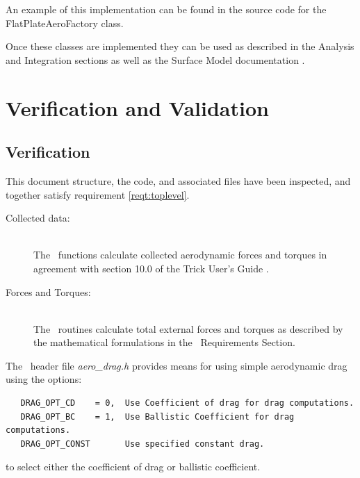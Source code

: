 An example of this implementation can be found in the source code for
the FlatPlateAeroFactory class.

Once these classes are implemented they can be used as described in
the Analysis and Integration sections as well as the
Surface Model documentation \cite{dynenv:SURFACEMODEL}.

\chapter{Verification and Validation}\label{ch:ivv}

\section{Verification}
\label{inspect:TLI}
 This document structure, the code, and associated files have been inspected, and together satisfy requirement \ref{reqt:toplevel}.


\label{inspect:math}
\begin{description}
\item[Collected data:] \ \\
The \aerodynamicsDesc\ functions calculate collected aerodynamic forces and
torques in agreement with section 10.0 of the Trick User's Guide
\cite{Vetter:TrickUser}.
\item[Forces and Torques:] \ \\
The \aerodynamicsDesc\ routines calculate total external forces and torques
as described by the mathematical formulations
in the \aerodynamicsDesc\ Requirements Section.
\end{description}

\label{inspect:aerod}
The \aerodynamicsDesc\ header file {\em aero\_drag.h} provides means for
using simple aerodynamic drag using the options:
\begin{verbatim}
   DRAG_OPT_CD    = 0,  Use Coefficient of drag for drag computations.
   DRAG_OPT_BC    = 1,  Use Ballistic Coefficient for drag computations.
   DRAG_OPT_CONST       Use specified constant drag.
\end{verbatim}
to select either the coefficient of drag or ballistic coefficient.

